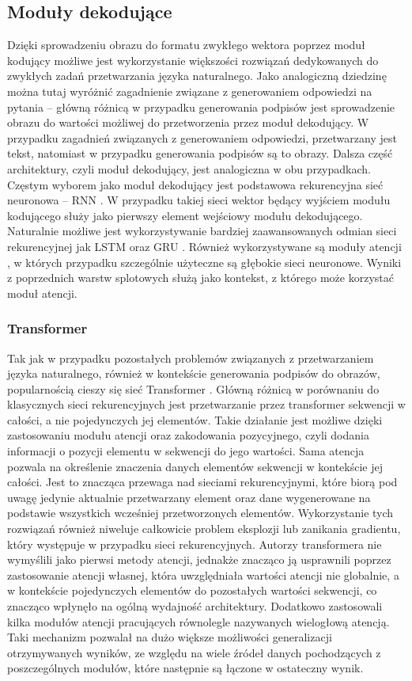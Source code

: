 \subsection{Moduły dekodujące}
Dzięki sprowadzeniu obrazu do formatu zwykłego wektora poprzez moduł kodujący możliwe jest wykorzystanie większości rozwiązań dedykowanych do zwykłych zadań przetwarzania języka naturalnego. Jako analogiczną dziedzinę można tutaj wyróżnić zagadnienie związane z generowaniem odpowiedzi na pytania -- główną różnicą w przypadku generowania podpisów jest sprowadzenie obrazu do wartości możliwej do przetworzenia przez moduł dekodujący. W przypadku zagadnień związanych z generowaniem odpowiedzi, przetwarzany jest tekst, natomiast w przypadku generowania podpisów są to obrazy. Dalsza część architektury, czyli moduł dekodujący, jest analogiczna w obu przypadkach. Częstym wyborem jako moduł dekodujący jest podstawowa rekurencyjna sieć neuronowa -- RNN \cite{rnn}. W przypadku takiej sieci wektor będący wyjściem modułu kodującego służy jako pierwszy element wejściowy modułu dekodującego. Naturalnie możliwe jest wykorzystywanie bardziej zaawansowanych odmian sieci rekurencyjnej jak LSTM \cite{lstm} oraz GRU \cite{gru}. Również wykorzystywane są moduły atencji \cite{attention} \cite{attentionImageCaptioning}, w których przypadku szczególnie użyteczne są głębokie sieci neuronowe. Wyniki z poprzednich warstw splotowych służą jako kontekst, z którego może korzystać moduł atencji.
\subsubsection{Transformer}
Tak jak w przypadku pozostałych problemów związanych z przetwarzaniem języka naturalnego, również w kontekście generowania podpisów do obrazów, popularnością cieszy się sieć Transformer \cite{transformer}. Główną różnicą w porównaniu do klasycznych sieci rekurencyjnych jest przetwarzanie przez transformer sekwencji w całości, a nie pojedynczych jej elementów. Takie działanie jest możliwe dzięki zastosowaniu modułu atencji oraz zakodowania pozycyjnego, czyli dodania informacji o pozycji elementu w sekwencji do jego wartości. Sama atencja pozwala na określenie znaczenia danych elementów sekwencji w kontekście jej całości. Jest to znacząca przewaga nad sieciami rekurencyjnymi, które biorą pod uwagę jedynie aktualnie przetwarzany element oraz dane wygenerowane na podstawie wszystkich wcześniej przetworzonych elementów. Wykorzystanie tych rozwiązań również niweluje całkowicie problem eksplozji lub zanikania gradientu, który występuje w przypadku sieci rekurencyjnych.
Autorzy transformera nie wymyślili jako pierwsi metody atencji, jednakże znacząco ją usprawnili poprzez zastosowanie atencji własnej, która uwzględniała wartości atencji nie globalnie, a w kontekście pojedynczych elementów do pozostałych wartości sekwencji, co znacząco wpłynęło na ogólną wydajność architektury. Dodatkowo zastosowali kilka modułów atencji pracujących równolegle nazywanych wielogłową atencją. Taki mechanizm pozwalał na dużo większe możliwości generalizacji otrzymywanych wyników, ze względu na wiele źródeł danych pochodzących z poszczególnych modułów, które następnie są łączone w ostateczny wynik.

